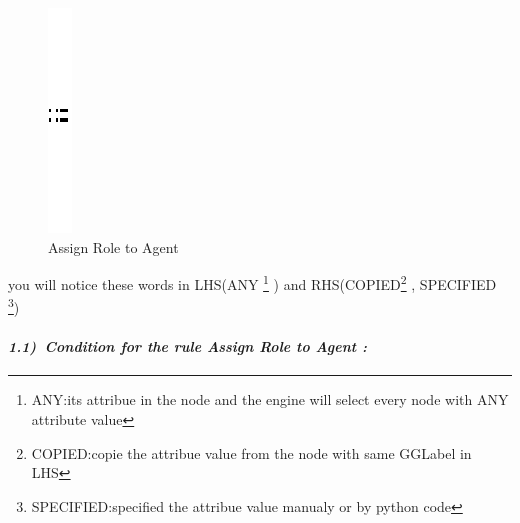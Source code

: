 \vspace{1cm}
\begin{figure}[th]
\centering
		\quad{}
		\includegraphics{ch3/img/sep}
		\quad{}
\caption{\label{fig:Create link between Agent and Role}Assign Role to Agent } 
\end{figure}

you will notice these words in LHS(ANY \footnote{ANY:its attribue in the node and the engine will select every node with ANY attribute value} ) and RHS(COPIED\footnote{COPIED:copie the attribue value from the node with same GGLabel in LHS} , SPECIFIED \footnote{SPECIFIED:specified the attribue value manualy or by python code})
 
  

\paragraph{\emph{1.1)~Condition for the rule Assign Role to Agent : } } 
 
